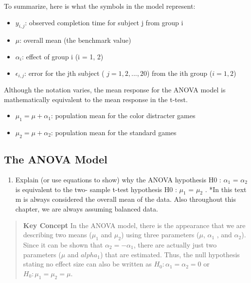 \documentclass[
]{report}
\providecommand{\tightlist}{%
  \setlength{\itemsep}{0pt}\setlength{\parskip}{0pt}}
\begin{document}
To summarize, here is what the symbols in the model represent:

\begin{itemize}
\tightlist
\item
  \(y_{i,j}\): observed completion time for subject j from group i
\item
  \(\mu\): overall mean (the benchmark value)
\item
  \(\alpha_i\): effect of group i (i = 1, 2)
\item
  \(\epsilon_{i,j}\): error for the jth subject ( \(j = 1, 2, ... , 20\)) from the ith group (\(i = 1, 2\))
\end{itemize}

Although the notation varies, the mean response for the ANOVA model is mathematically equivalent to the mean response in the t-test.

\begin{itemize}
\tightlist
\item
  \(\mu_1 = \mu + \alpha_1\): population mean for the color distracter games
\item
  \(\mu_2 = \mu + \alpha_2\): population mean for the standard games
\end{itemize}

\subsection*{The ANOVA Model}\label{the-anova-model-1}

\begin{enumerate}
\def\labelenumi{\arabic{enumi}.}
\setcounter{enumi}{15}
\tightlist
\item
  Explain (or use equations to show) why the ANOVA hypothesis H0 : \(\alpha_1\) = \(\alpha_2\) is equivalent to the two- sample t-test hypothesis H0 : \(\mu_1\) = \(\mu_2\) .
  *In this text m is always considered the overall mean of the data. Also throughout this chapter, we are always assuming balanced data.
\end{enumerate}

\begin{quote}
\textbf{Key Concept}
In the ANOVA model, there is the appearance that we are describing two means (\(\mu_1\) and \(\mu_2\)) using three parameters (\(\mu\), \(\alpha_1\) , and \(\alpha_2\)). Since it can be shown that \(\alpha_2 = -\alpha_1\), there are actually just two parameters (\(\mu\) and \(alpha_1\)) that are estimated. Thus, the null hypothesis stating no effect size can also be written as \(H_0: \alpha_1 = \alpha_2 = 0\) or \(H_0: \mu_1 = \mu_2 = \mu\).
\end{quote}
\end{document}
